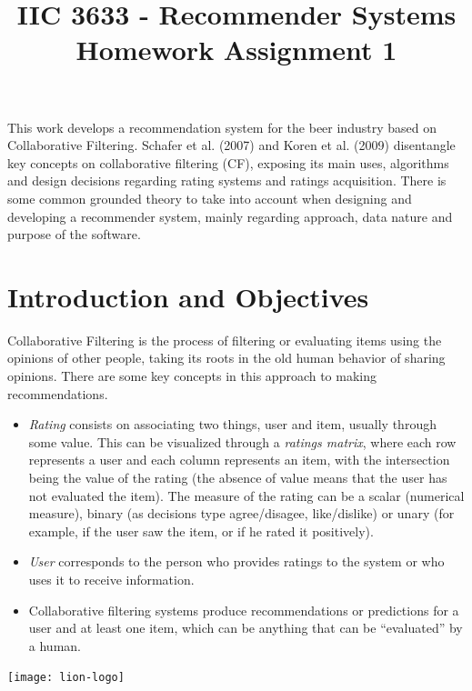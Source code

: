 \documentclass[letterpaper, 10 pt, conference]{ieeeconf}  %
\title{\LARGE \bf
IIC 3633 - Recommender Systems\\
Homework Assignment 1
}
\begin{document}
\maketitle
\thispagestyle{empty}
\pagestyle{empty}



\justify
This work develops a recommendation system for the beer industry based on Collaborative Filtering. Schafer et al. (2007) \cite{c1} and Koren et al. (2009) \cite{c3} disentangle key concepts on collaborative filtering (CF), exposing its main uses, algorithms and design decisions regarding rating systems and ratings acquisition. 
There is some common grounded theory to take into account when designing and developing a recommender system, mainly regarding approach, data nature and purpose of the software.

\section{Introduction and Objectives}

Collaborative Filtering is the process of filtering or evaluating items using the opinions of other people, taking its roots in the old human behavior of sharing opinions. There are some key concepts in this approach to making recommendations. 

\begin{itemize}

    \item \textit{Rating} consists on associating two things, user and item, usually through some value. This can be visualized through a \textit{ratings matrix}, where each row represents a user and each column represents an item, with the intersection being the value of the rating (the absence of value means that the user has not evaluated the item). The measure of the rating can be a scalar (numerical measure), binary (as decisions type agree/disagee, like/dislike) or unary (for example, if the user saw the item, or if he rated it positively).

    \item \textit{User} corresponds to the person who provides ratings to the system or who uses it to receive information.
    
    \item Collaborative filtering systems produce recommendations or predictions for a user and at least one item, which can be anything that can be ``evaluated'' by a human.

\end{itemize}\texttt{[image: lion-logo]}
\end{document}

